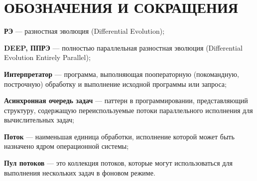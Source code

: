 \chapter*{ОБОЗНАЧЕНИЯ И СОКРАЩЕНИЯ}

\textbf{РЭ} ---
разностная эволюция (Differential Evolution);

\textbf{DEEP, ППРЭ} ---
полностью параллельная разностная эволюция
(Differential Evolution Entirely Parallel);

\textbf{Интерпретатор} ---
программа, выполняющая пооператорную
(покомандную, построчную) обработку
и выполнение исходной программы или запроса;

\textbf{Асинхронная очередь задач} ---
паттерн в программировании,
представляющий структуру,
содержащую переиспользуемые
потоки параллельного исполнения
для вычислительных задач;

\textbf{Поток} ---
наименьшая единица обработки,
исполнение которой может быть назначено
ядром операционной системы;

\textbf{Пул потоков} ---
это коллекция потоков,
которые могут использоваться
для выполнения нескольких задач
в фоновом режиме.
